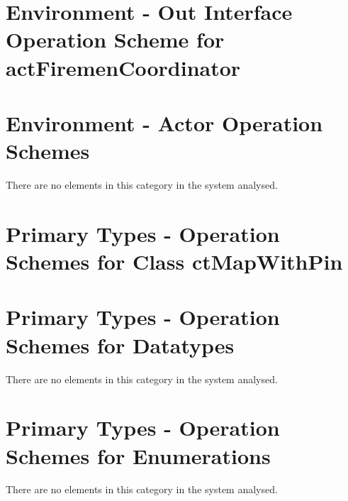 \section{Environment - Out Interface Operation Scheme for actFiremenCoordinator}
\label{OM-EM-OutInterface-OS-actFiremenCoordinator}




\section{Environment - Actor Operation Schemes}
There are no elements in this category in the system analysed.
		



\section{Primary Types - Operation Schemes for Class ctMapWithPin} 
\label{OM-CM-PTClass-ctMapWithPin}







\section{Primary Types - Operation Schemes for Datatypes}
There are no elements in this category in the system analysed.




\section{Primary Types - Operation Schemes for Enumerations}
There are no elements in this category in the system analysed.





